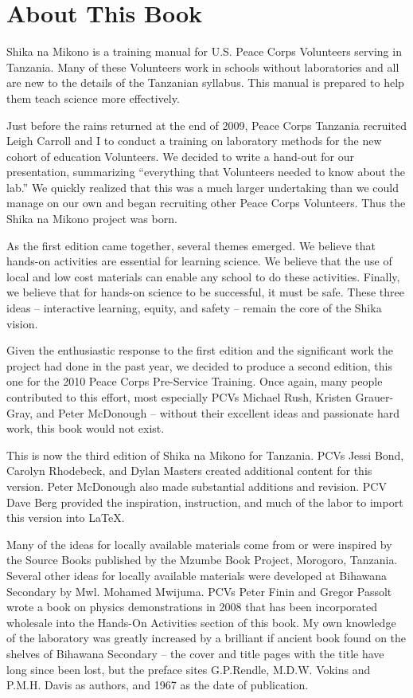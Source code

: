 \clearpage
{}
{}
\chapter*{About This Book}

Shika na Mikono is a training manual for U.S. Peace Corps Volunteers serving in Tanzania. Many of these Volunteers work in schools without laboratories and all are new to the details of the Tanzanian syllabus. This manual is prepared to help them teach science more effectively.

Just before the rains returned at the end of 2009, 
Peace Corps Tanzania recruited Leigh Carroll and I 
to conduct a training on laboratory methods 
for the new cohort of education Volunteers. 
We decided to write a hand-out for our presentation, 
summarizing ``everything that Volunteers needed to know about the lab.'' 
We quickly realized that this was a much larger undertaking 
than we could manage on our own 
and began recruiting other Peace Corps Volunteers. 
Thus the Shika na Mikono project was born.

As the first edition came together, several themes emerged. 
We believe that hands-on activities are essential for learning science. 
We believe that the use of local and low cost materials 
can enable any school to do these activities. 
Finally, we believe that for hands-on science to be successful, 
it must be safe. 
These three ideas -- interactive learning, equity, and safety -- 
remain the core of the Shika vision.

Given the enthusiastic response to the first edition 
and the significant work the project had done in the past year, 
we decided to produce a second edition, 
this one for the 2010 Peace Corps Pre-Service Training. 
Once again, many people contributed to this effort, 
most especially PCVs Michael Rush, Kristen Grauer-Gray, and Peter McDonough 
-- without their excellent ideas and passionate hard work, 
this book would not exist.

This is now the third edition of Shika na Mikono for Tanzania.
PCVs Jessi Bond, Carolyn Rhodebeck, and Dylan Masters 
created additional content for this version. Peter McDonough 
also made substantial additions and revision. 
PCV Dave Berg provided the inspiration, instruction, 
and much of the labor to import this version into \LaTeX.

Many of the ideas for locally available materials 
come from or were inspired by the Source Books 
published by the Mzumbe Book Project, Morogoro, Tanzania. 
Several other ideas for locally available materials 
were developed at Bihawana Secondary by Mwl. Mohamed Mwijuma. 
PCVs Peter Finin and Gregor Passolt wrote 
a book on physics demonstrations in 2008 
that has been incorporated wholesale 
into the Hands-On Activities section of this book. 
My own knowledge of the laboratory was greatly increased 
by a brilliant if ancient book found on the shelves of Bihawana Secondary -- 
the cover and title pages with the title have long since been lost, 
but the preface sites G.P.Rendle, M.D.W. Vokins and P.M.H. Davis as authors, 
and 1967 as the date of publication.

